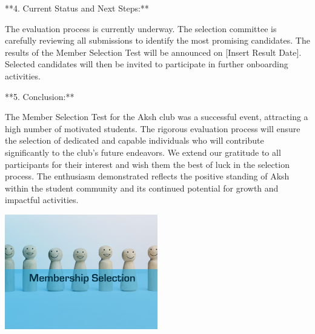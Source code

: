\documentclass{article}
\begin{document}
**4. Current Status and Next Steps:**

The evaluation process is currently underway. The selection committee is carefully reviewing all submissions to identify the most promising candidates. The results of the Member Selection Test will be announced on [Insert Result Date]. Selected candidates will then be invited to participate in further onboarding activities.

**5. Conclusion:**

The Member Selection Test for the Aksh club was a successful event, attracting a high number of motivated students. The rigorous evaluation process will ensure the selection of dedicated and capable individuals who will contribute significantly to the club's future endeavors. We extend our gratitude to all participants for their interest and wish them the best of luck in the selection process. The enthusiasm demonstrated reflects the positive standing of Aksh within the student community and its continued potential for growth and impactful activities.

\vspace{1cm}
\begin{center}
    \includegraphics[width=0.5\textwidth]{photo_1.jpg}
\end{center}
\end{document}

